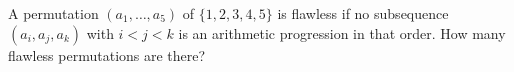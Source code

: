 A permutation $(a_1,\ldots,a_5)$ of $\{1,2,3,4,5\}$ is flawless if no subsequence $(a_i,a_j,a_k)$ with $i<j<k$ is an arithmetic progression in that order. How many flawless permutations are there?
